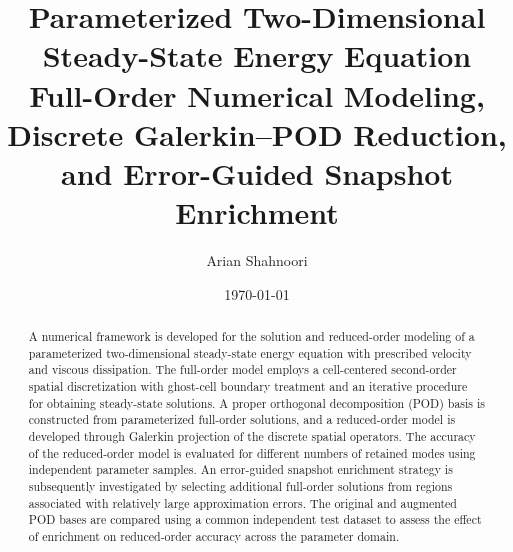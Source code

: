 \documentclass[11pt,a4paper]{article}
\title{
    \Huge\textbf{Parameterized Two-Dimensional
    Steady-State Energy Equation}\\[0.4cm]
    \Large
    Full-Order Numerical Modeling, Discrete
    Galerkin--POD Reduction, and
    Error-Guided Snapshot Enrichment
}
\author{
    \Large Arian Shahnoori
}
\date{\today}
\begin{document}



\maketitle

\begin{abstract}
A numerical framework is developed for the solution and
reduced-order modeling of a parameterized two-dimensional
steady-state energy equation with prescribed velocity and
viscous dissipation. The full-order model employs a
cell-centered second-order spatial discretization with
ghost-cell boundary treatment and an iterative procedure
for obtaining steady-state solutions. A proper orthogonal
decomposition (POD) basis is constructed from parameterized
full-order solutions, and a reduced-order model is developed
through Galerkin projection of the discrete spatial operators.
The accuracy of the reduced-order model is evaluated for
different numbers of retained modes using independent
parameter samples. An error-guided snapshot enrichment
strategy is subsequently investigated by selecting additional
full-order solutions from regions associated with relatively
large approximation errors. The original and augmented POD
bases are compared using a common independent test dataset
to assess the effect of enrichment on reduced-order accuracy
across the parameter domain.
\end{abstract}

\vspace{0.4cm}

\end{document}
